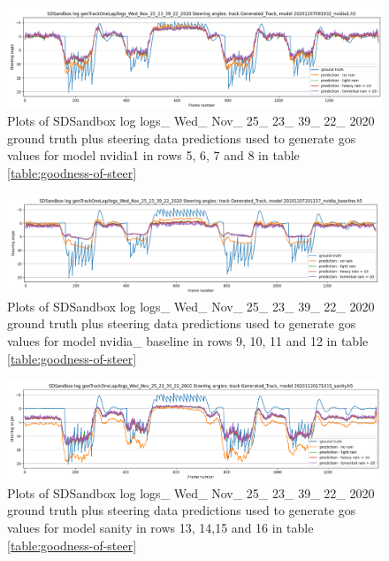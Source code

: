 \begin{figure}[ht]
 \centering 
 \includegraphics[width=\textwidth]{Figures/sa_Generated_Track_20201207091932_nvidia1.h5.png}
 \caption{Plots of SDSandbox log logs\_ Wed\_ Nov\_ 25\_ 23\_ 39\_ 22\_ 2020 ground truth plus steering data predictions used to generate gos values for model nvidia1 in rows 5, 6, 7  and 8 in table \ref{table:goodness-of-steer}}
 \label{fig:sa_Generated_Track_20201207091932_nvidia1.h5} 
\end{figure}

\begin{figure}[ht]
 \centering 
 \includegraphics[width=\textwidth]{Figures/sa_Generated_Track_20201207201157_nvidia_baseline.h5.png}
 \caption{Plots of SDSandbox log logs\_ Wed\_ Nov\_ 25\_ 23\_ 39\_ 22\_ 2020 ground truth plus steering data predictions used to generate gos values for model nvidia\_ baseline in rows 9, 10, 11  and 12 in table \ref{table:goodness-of-steer}}
 \label{fig:sa_Generated_Track_20201207201157_nvidia_baseline.h5} 
\end{figure}

\begin{figure}[ht]
 \centering 
 \includegraphics[width=\textwidth]{Figures/sa_Generated_Track_20201120171015_sanity.h5.png}
 \caption{Plots of SDSandbox log logs\_ Wed\_ Nov\_ 25\_ 23\_ 39\_ 22\_ 2020 ground truth plus steering data predictions used to generate gos values for model sanity in rows 13, 14,15  and 16 in table \ref{table:goodness-of-steer}}
 \label{fig:sa_Generated_Track_20201120171015_sanity.h5} 
\end{figure}

